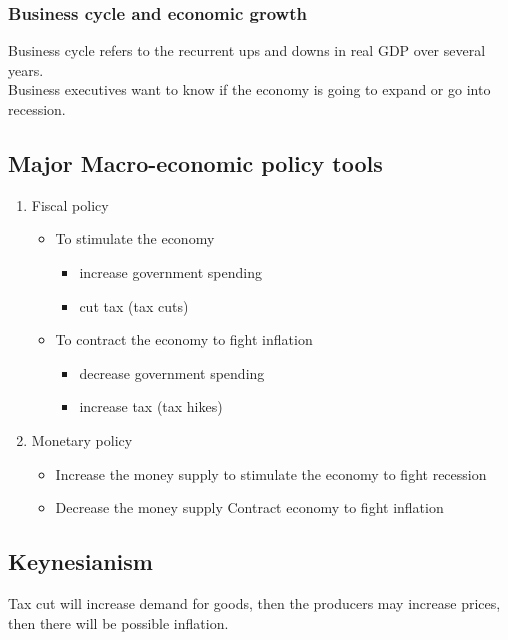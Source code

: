 \documentclass[a4paper,13pt]{report}
\begin{document}
\subsubsection{Business cycle and economic growth}
Business cycle refers to the recurrent ups and downs in real GDP over several years. \\
Business executives want to know if the economy is going to expand or go into recession.

\subsection{Major Macro-economic policy tools}
\begin{enumerate}
\item Fiscal policy
    \begin{itemize}
    \item To stimulate the economy
    \begin{itemize}
        \item increase government spending
        \item cut tax (tax cuts)
    \end{itemize}
    \item To contract the economy to fight inflation
    \begin{itemize}
        \item decrease government spending
        \item increase tax (tax hikes)
    \end{itemize}
        
    \end{itemize}
\item Monetary policy
    \begin{itemize}
        \item Increase the money supply to stimulate the economy to fight recession
        \item Decrease the money supply Contract economy to fight inflation
    \end{itemize}
\end{enumerate}

\subsection{Keynesianism}
Tax cut will increase demand for goods, then the producers may increase prices, then there will be possible inflation.
\end{document}
